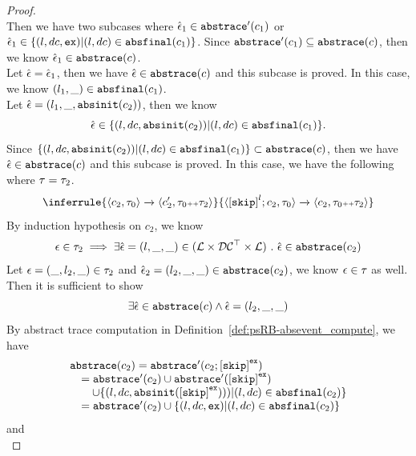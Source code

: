 \begin{proof}
\[    \]
    Then we have two subcases where 
    $\hat{\mathtt{\epsilon}{}}_1 \in \mathtt{abs}{\mathtt{trace}}'(c_1)$ or $\hat{\mathtt{\epsilon}{}}_1 \in \{ (l, dc, \mathtt{ex}) | (l, dc) \in \mathtt{abs}{\mathtt{final}}(c_1) \}$.
    Since $\mathtt{abs}{\mathtt{trace}}'(c_1) \subseteq \mathtt{abs}{\mathtt{trace}}(c)$, then we know $\hat{\mathtt{\epsilon}{}}_1 \in \mathtt{abs}{\mathtt{trace}}(c)$.
    \\
    Let $\hat{\mathtt{\epsilon}{}} = \hat{\mathtt{\epsilon}{}}_1$, then we have $\hat{\mathtt{\epsilon}{}} \in \mathtt{abs}{\mathtt{trace}}(c)$ and this subcase is proved.
    In this case, we know $(l_1, \_) \in \mathtt{abs}{\mathtt{final}}(c_1)$.
    \\
    Let $\hat{\mathtt{\epsilon}{}} = (l_1, \_, \mathtt{abs}{\mathtt{init}}(c_2))$, then we know 
    \[
      \hat{\mathtt{\epsilon}{}} \in   \{ (l, dc, \mathtt{abs}{\mathtt{init}}(c_2)) | (l, dc) \in \mathtt{abs}{\mathtt{final}}(c_1) \}. 
    \]
    Since $\{ (l, dc, \mathtt{abs}{\mathtt{init}}(c_2)) | (l, dc) \in \mathtt{abs}{\mathtt{final}}(c_1) \}  \subset\mathtt{abs}{\mathtt{trace}}(c)$,  then we have $\hat{\mathtt{\epsilon}{}} \in \mathtt{abs}{\mathtt{trace}}(c)$ and this subcase is proved.
    In this case, we have the following where $\mathtt{\tau} = \mathtt{\tau}_2$.
    \[
      \inferrule
      {
      \config{{c_2, \trace_0}}
      \xrightarrow{}
      \config{{c_2',  \trace_0 \tracecat \trace_2}}
      }
      {
      \config{{\clabel{\eskip}^l; c_2, \trace_0}} 
      \xrightarrow{} 
      \config{{c_2, \trace_0 \tracecat \trace_2}}
      }
    \]
    By induction hypothesis on $c_2$, we know 
    \[
      \mathtt{\epsilon} \in \mathtt{\tau}_2
      \implies
      \exists \hat{\mathtt{\epsilon}{}} = (l, \_, \_) \in (\mathcal{L} \times \mathcal{DC}^{\top} \times \mathcal{L}) ~.~ 
      \hat{\mathtt{\epsilon}{}} \in \mathtt{abs}{\mathtt{trace}}(c_2)
    \]
    Let $\mathtt{\epsilon} = (\_, l_2, \_) \in \mathtt{\tau}_2$ and $\hat{\mathtt{\epsilon}{}}_2 = (l_2, \_, \_) \in \mathtt{abs}{\mathtt{trace}}(c_2)$,
    we know $\mathtt{\epsilon} \in \mathtt{\tau}$ as well.
  Then it is sufficient to show
    \[
      \exists 
    \hat{\mathtt{\epsilon}{}} \in \mathtt{abs}{\mathtt{trace}}(c) \land  \hat{\mathtt{\epsilon}{}} = (l_2, \_, \_)
    \]
    By abstract trace computation in Definition~\ref{def:psRB-absevent_compute}, we have
    \[
      \begin{array}{l}
        \absflow(c_2) = \absflow'(c_2; \clabel{\eskip}^{\lex}) 
        \\ \quad
        = \absflow'(c_2) \cup \absflow'(\clabel{\eskip}^{\lex}) 
        \\ \qquad
        \cup \{ (l, dc, \absinit(\clabel{\eskip}^{\lex}))) | (l, dc) \in \absfinal(c_2) \} 
        \\ \quad
        = \absflow'(c_2) \cup  \{ (l, dc, \lex) | (l, dc) \in \absfinal(c_2) \} 
     \end{array}
    \]  
    and 
    \[
\]
\end{proof}
